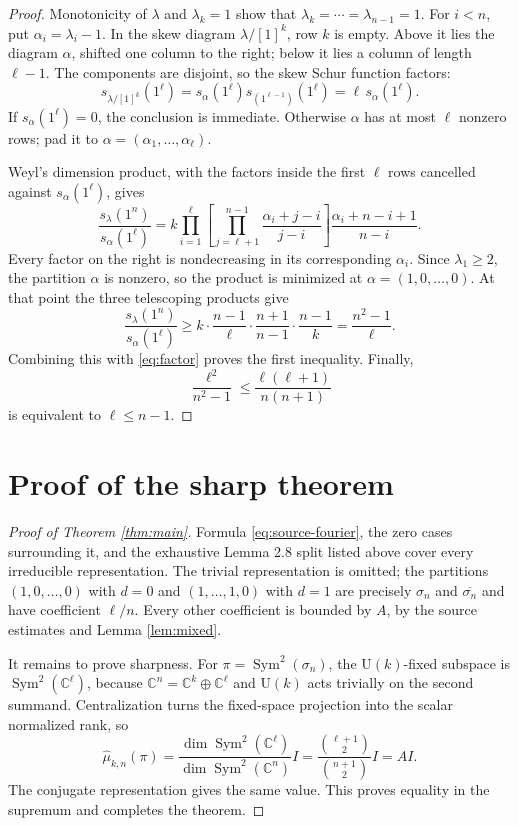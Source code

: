 \documentclass[11pt]{article}
\newcommand{\U}{\mathrm U}
\newcommand{\Sym}{\operatorname{Sym}}
\begin{document}
\begin{proof}
Monotonicity of $\lambda$ and $\lambda_k=1$ show that
$\lambda_k=\cdots=\lambda_{n-1}=1$.  For $i<n$, put
$\alpha_i=\lambda_i-1$.  In the skew diagram $\lambda/[1]^k$, row $k$ is
empty.  Above it lies the diagram $\alpha$, shifted one column to the right;
below it lies a column of length $\ell-1$.  The components are disjoint, so
the skew Schur function factors:
\begin{equation}\label{eq:factor}
 s_{\lambda/[1]^k}(1^\ell)
 =s_\alpha(1^\ell)s_{(1^{\ell-1})}(1^\ell)
 =\ell\,s_\alpha(1^\ell).
\end{equation}
If $s_\alpha(1^\ell)=0$, the conclusion is immediate.  Otherwise $\alpha$
has at most $\ell$ nonzero rows; pad it to
$\alpha=(\alpha_1,\ldots,\alpha_\ell)$.

Weyl's dimension product, with the factors inside the first $\ell$ rows
cancelled against $s_\alpha(1^\ell)$, gives
\begin{equation}\label{eq:E}
 \frac{s_\lambda(1^n)}{s_\alpha(1^\ell)}
 =k\prod_{i=1}^{\ell}
 \left[
   \prod_{j=\ell+1}^{n-1}
   \frac{\alpha_i+j-i}{j-i}
 \right]
 \frac{\alpha_i+n-i+1}{n-i}.
\end{equation}
Every factor on the right is nondecreasing in its corresponding
$\alpha_i$.  Since $\lambda_1\geq2$, the partition $\alpha$ is nonzero, so
the product is minimized at $\alpha=(1,0,\ldots,0)$.  At that point the
three telescoping products give
\[
 \frac{s_\lambda(1^n)}{s_\alpha(1^\ell)}
 \geq
 k\cdot\frac{n-1}{\ell}\cdot\frac{n+1}{n-1}
       \cdot\frac{n-1}{k}
 =\frac{n^2-1}{\ell}.
\]
Combining this with \eqref{eq:factor} proves the first inequality.  Finally,
\[
 \frac{\ell^2}{n^2-1}
 \leq\frac{\ell(\ell+1)}{n(n+1)}
\]
is equivalent to $\ell\leq n-1$.
\end{proof}

\section{Proof of the sharp theorem}

\begin{proof}[Proof of Theorem \ref{thm:main}]
Formula \eqref{eq:source-fourier}, the zero cases surrounding it, and the
exhaustive Lemma 2.8 split listed above cover every irreducible
representation.  The trivial representation is omitted; the partitions
$(1,0,\ldots,0)$ with $d=0$ and $(1,\ldots,1,0)$ with $d=1$ are precisely
$\sigma_n$ and $\overline{\sigma_n}$ and have coefficient $\ell/n$.
Every other coefficient is bounded by $A$, by the source estimates and
Lemma \ref{lem:mixed}.

It remains to prove sharpness.  For $\pi=\Sym^2(\sigma_n)$, the
$\U(k)$-fixed subspace is $\Sym^2(\mathbb C^\ell)$, because
$\mathbb C^n=\mathbb C^k\oplus\mathbb C^\ell$ and $\U(k)$ acts trivially
on the second summand.  Centralization turns the fixed-space projection into
the scalar normalized rank, so
\[
 \widehat\mu_{k,n}(\pi)
 =\frac{\dim\Sym^2(\mathbb C^\ell)}
        {\dim\Sym^2(\mathbb C^n)}I
 =\frac{\binom{\ell+1}{2}}{\binom{n+1}{2}}I
 =A I.
\]
The conjugate representation gives the same value.  This proves equality in
the supremum and completes the theorem.
\end{proof}
\end{document}
